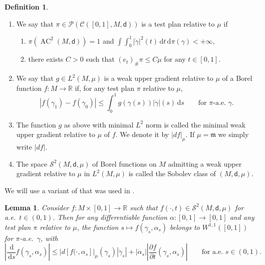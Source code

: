 \documentclass[10pt]{article}
\newcommand{\m}{\mathfrak{m}}
\renewcommand{\d}{\,\mathrm{d}}
\newcommand{\dist}{\mathsf{d}}
\DeclareMathOperator{\AC}{AC}
\theoremstyle{plain}
\newtheorem{lemma}[theorem]{Lemma}
\theoremstyle{definition}
\newtheorem{definition}[theorem]{Definition}
\newcommand{\accurves}{\AC^2(M,\dist)}
\begin{document}
\begin{definition}
\begin{enumerate}
    \item We say that $\pi \in \mathcal{P}(\mathcal{C}([0,1],M,\dist))$ is a test plan relative to $\mu$ if
    \begin{enumerate}
        \item[(i)] $\pi(\accurves)=1$ and $\int \int_0^1 |\dot{\gamma}|^2(t) \d t \d \pi(\gamma) < +\infty$,
        \item[(ii)] there exists $C>0$ such that $(e_t)_\# \pi \le C \mu$ for any $t \in [0,1]$.
    \end{enumerate}

\item We say that $g \in L^2(M,\mu)$ is a weak upper gradient relative to $\mu$ of a Borel function $f:M \to \mathbb{R}$ if, for any test plan $\pi$ relative to $\mu$,
    \[
    |f(\gamma_1)- f(\gamma_0)| \le \int_0^1 g(\gamma(s)) |\dot{\gamma}|(s) \d s \qquad \text{for $\pi$-a.e.~$\gamma$.} 
    \]
    
\item The function $g$ as above with  minimal $L^2$ norm is called the minimal weak upper gradient relative to $\mu$ of $f$. We denote it by $|df|_\mu$.  If $\mu=\m$ we simply write $|df|$.

 \item The space $\mathcal{S}^2(M,\dist,\mu)$  of Borel functions on $M$ admitting a weak upper gradient relative to $\mu$ in $L^2(M,\mu)$ is called the Sobolev class of $(M,\dist,\mu)$.
 \end{enumerate}
\end{definition}

We will use a variant of \cite[Proposition 5.7]{AGSInv} that was used in \cite{GarofaloMondino-13}.


\begin{lemma}
Consider $f:M \times [0,1] \to \mathbb{R}$ such that $f(\cdot,t) \in  \mathcal{S}^2(M,\dist,\mu)$ for a.e.~$t\in (0,1)$. Then for any differentiable function $\alpha : [0,1] \to [0,1]$ and any test plan $\pi$ relative to $\mu$, the function $s \mapsto f(\gamma_s,\alpha_s)$ belongs to $W^{1,1}([0,1])$ for $\pi$-a.e.~$\gamma$, with
\[
\left| \frac{\d}{\d s} f(\gamma_s,\alpha_s)\right| \le |d[f(\cdot,\alpha_s]|_\mu (\gamma_s) |\dot{\gamma}_s| + |\dot\alpha_s| \left| \frac{\partial f}{\partial t} (\gamma_s,\alpha_s) \right|\qquad \text{for a.e.~$s\in (0,1)$.}
\]
\end{lemma}
\end{document}
